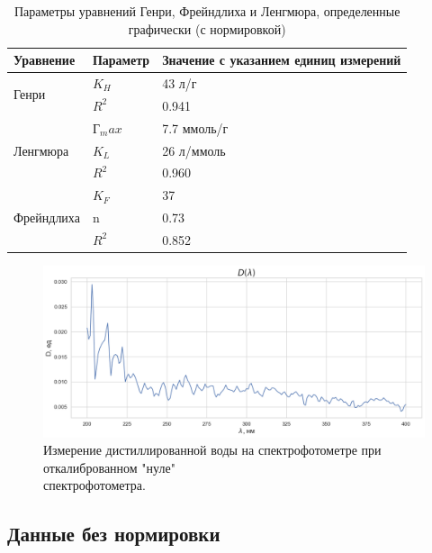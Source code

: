 \documentclass[a4paper,12pt]{article} %
\begin{document}
\begin{table}[H]
\centering
\begin{tabular}{|l|l|l|}
\hline
Уравнение                   & Параметр      & Значение с указанием единиц измерений \\ \hline
\multirow{2}{*}{Генри}      & $K_H$         & 43 л/г                                \\ \cline{2-3} 
                            & $R^2$         & 0.941                                 \\ \hline
\multirow{3}{*}{Ленгмюра}   & $\text{Г}_max$ & 7.7 ммоль/г                           \\ \cline{2-3} 
                            & $K_L$         & 26 л/ммоль                            \\ \cline{2-3} 
                            & $R^2$         & 0.960                                 \\ \hline
\multirow{3}{*}{Фрейндлиха} & $K_F$         & 37                                    \\ \cline{2-3} 
                            & n             & 0.73                                  \\ \cline{2-3} 
                            & $R^2$         & 0.852                                 \\ \hline
\end{tabular}
\caption{Параметры уравнений Генри, Фрейндлиха и Ленгмюра, определенные графически (с нормировкой)}
\end{table}

\begin{figure}[H]
    \includegraphics[width=18cm]{water.png}
    \caption{Измерение дистиллированной воды на спектрофотометре при откалиброванном "нуле" \\ спектрофотометра.}
    \label{wat}
\end{figure}


\subsection*{Данные без нормировки}
\end{document}
